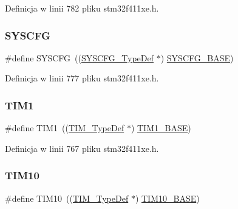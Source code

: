 Definicja w linii 782 pliku stm32f411xe.\+h.

\mbox{\label{group___peripheral__declaration_ga3c833fe1c486cb62250ccbca32899cb8}} 
\subsubsection{\texorpdfstring{S\+Y\+S\+C\+FG}{SYSCFG}}
{\footnotesize\ttfamily \#define S\+Y\+S\+C\+FG~((\hyperlink{struct_s_y_s_c_f_g___type_def}{S\+Y\+S\+C\+F\+G\+\_\+\+Type\+Def} $\ast$) \hyperlink{group___peripheral__memory__map_ga62246020bf3b34b6a4d8d0e84ec79d3d}{S\+Y\+S\+C\+F\+G\+\_\+\+B\+A\+SE})}



Definicja w linii 777 pliku stm32f411xe.\+h.

\mbox{\label{group___peripheral__declaration_ga2e87451fea8dc9380056d3cfc5ed81fb}} 
\subsubsection{\texorpdfstring{T\+I\+M1}{TIM1}}
{\footnotesize\ttfamily \#define T\+I\+M1~((\hyperlink{struct_t_i_m___type_def}{T\+I\+M\+\_\+\+Type\+Def} $\ast$) \hyperlink{group___peripheral__memory__map_gaf8aa324ca5011b8173ab16585ed7324a}{T\+I\+M1\+\_\+\+B\+A\+SE})}



Definicja w linii 767 pliku stm32f411xe.\+h.

\mbox{\label{group___peripheral__declaration_ga46b2ad3f5f506f0f8df0d2ec3e767267}} 
\subsubsection{\texorpdfstring{T\+I\+M10}{TIM10}}
{\footnotesize\ttfamily \#define T\+I\+M10~((\hyperlink{struct_t_i_m___type_def}{T\+I\+M\+\_\+\+Type\+Def} $\ast$) \hyperlink{group___peripheral__memory__map_ga3eff32f3801db31fb4b61d5618cad54a}{T\+I\+M10\+\_\+\+B\+A\+SE})}



